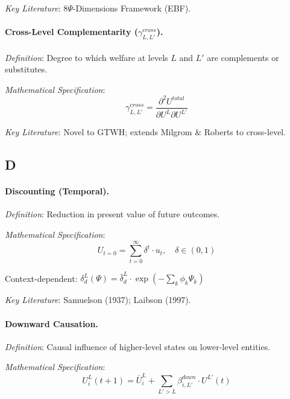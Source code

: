 \textit{Key Literature}: 8$\Psi$-Dimensions Framework (EBF).

\medskip

\paragraph{Cross-Level Complementarity ($\gamma^{cross}_{L,L'}$).}
\textit{Definition}: Degree to which welfare at levels $L$ and $L'$ are 
complements or substitutes.

\textit{Mathematical Specification}:
\begin{equation}
\gamma^{cross}_{L,L'} = \frac{\partial^2 U^{total}}{\partial U^L \partial U^{L'}}
\end{equation}

\textit{Key Literature}: Novel to GTWH; extends Milgrom \& Roberts to cross-level.

\subsection*{D}

\paragraph{Discounting (Temporal).}
\textit{Definition}: Reduction in present value of future outcomes.

\textit{Mathematical Specification}:
\begin{equation}
U_{t=0} = \sum_{t=0}^{\infty} \delta^t \cdot u_t, \quad \delta \in (0,1)
\end{equation}

Context-dependent: $\delta^L_d(\Psi) = \bar{\delta}^L_d \cdot \exp(-\sum_k \phi_k \Psi_k)$

\textit{Key Literature}: Samuelson (1937); Laibson (1997).

\medskip

\paragraph{Downward Causation.}
\textit{Definition}: Causal influence of higher-level states on lower-level entities.

\textit{Mathematical Specification}:
\begin{equation}
U^L_i(t+1) = \bar{U}^L_i + \sum_{L' > L} \beta^{down}_{i,L'} \cdot U^{L'}(t)
\end{equation}

